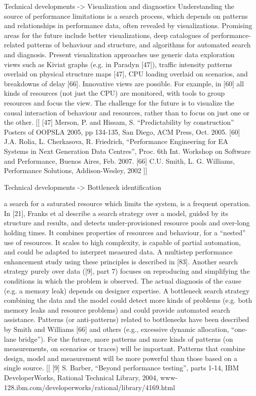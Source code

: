 \documentclass[runningheads,a4paper]{llncs}
\begin{document}
Technical developments -> Visualization and diagnostics
Understanding the source of performance limitations is a search process, which
depends on patterns and relationships in performance data, often revealed by
visualizations. Promising areas for the future include better visualizations,
deep catalogues of performance-related patterns of behaviour and structure, and
algorithms for automated search and diagnosis.
Present visualization approaches use generic data exploration views such as
Kiviat graphs (e.g. in Paradyn [47]), traffic intensity patterns overlaid on
physical structure maps [47], CPU loading overlaid on scenarios, and breakdowns
of delay [66]. Innovative views are possible. For example, in [60] all kinds of
resources (not just the CPU) are monitored, with tools to group resources and
focus the view. The challenge for the future is to visualize the causal interaction of
behaviour and resources, rather than to focus on just one or the other.
[[
[47] Merson, P. and Hissam, S. “Predictability by construction” Posters of
OOPSLA 2005, pp 134-135, San Diego, ACM Press, Oct. 2005.
[60] J.A. Rolia, L. Cherkasova, R. Friedrich, “Performance Engineering for EA
Systems in Next Generation Data Centres”, Proc. 6th Int. Workshop on Software and Performance, Buenos Aires, Feb. 2007.
[66] C.U. Smith, L. G. Williams, Performance Solutions, Addison-Wesley, 2002
]]

Technical developments -> Bottleneck identification

a search for a saturated resource which limits the system, is a frequent
operation. In [21], Franks et al describe a search strategy over a model, guided by its structure and
results, and detects under-provisioned resource pools and over-long holding
times. It combines properties of resources and behaviour, for a “nested” use of
resources. It scales to high complexity, is capable of partial automation, and
could be adapted to interpret measured data. A multistep performance enhancement
study using these principles is described in [83].
Another search strategy purely over data ([9], part 7) focuses on reproducing
and simplifying the conditions in which the problem is observed. The actual diagnosis
of the cause (e.g. a memory leak) depends on designer expertise.
A bottleneck search strategy combining the data and the model could detect more
kinds of problems (e.g. both memory leaks and resource problems) and could
provide automated search assistance.
Patterns (or anti-patterns) related to bottlenecks have been described by Smith
and Williams [66] and others (e.g., excessive dynamic allocation, “one-lane bridge”).
For the future, more patterns and more kinds of patterns (on measurements, on
scenarios or traces) will be important. Patterns that combine design, model and
measurement will be more powerful than those based on a single source.
[[
[9] S. Barber, “Beyond performance testing”, parts 1-14, IBM DeveloperWorks,
Rational Technical Library, 2004, www-128.ibm.com/developerworks/rational/library/4169.html
\end{document}
